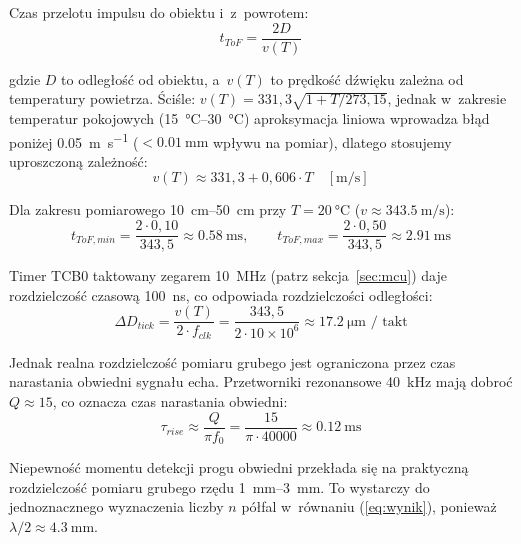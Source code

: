 \documentclass[a4paper,11pt]{article}
\begin{document}
	Czas przelotu impulsu do obiektu i~z~powrotem:
	\begin{equation}
		t_{ToF} = \frac{2D}{v(T)}
		\label{eq:tof}
	\end{equation}
	
	gdzie $D$ to odległość od obiektu, a~$v(T)$ to prędkość dźwięku zależna
	od temperatury powietrza. Ściśle: $v(T) = 331{,}3\sqrt{1 + T/273{,}15}$,
	jednak w~zakresie temperatur pokojowych (\SIrange{15}{30}{\celsius})
	aproksymacja liniowa wprowadza błąd poniżej \SI{0,05}{\metre\per\second}
	($< \SI{0,01}{\milli\metre}$ wpływu na pomiar), dlatego stosujemy
	uproszczoną zależność:
	\begin{equation}
		v(T) \approx 331{,}3 + 0{,}606 \cdot T \quad [\si{\metre\per\second}]
		\label{eq:predkosc_dzwieku}
	\end{equation}
	
	Dla zakresu pomiarowego \SIrange{10}{50}{\centi\metre} przy $T = \SI{20}{\celsius}$
	($v \approx \SI{343,5}{\metre\per\second}$):
	\begin{equation}
		t_{ToF,min} = \frac{2 \cdot 0{,}10}{343{,}5} \approx \SI{0,58}{\milli\second}, \qquad
		t_{ToF,max} = \frac{2 \cdot 0{,}50}{343{,}5} \approx \SI{2,91}{\milli\second}
		\label{eq:tof_zakres}
	\end{equation}
	
	Timer TCB0 taktowany zegarem \SI{10}{\mega\hertz} (patrz sekcja~\ref{sec:mcu})
	daje rozdzielczość czasową \SI{100}{\nano\second}, co odpowiada rozdzielczości odległości:
	\begin{equation}
		\Delta D_{tick} = \frac{v(T)}{2 \cdot f_{clk}} = \frac{343{,}5}{2 \cdot 10 \times 10^6} \approx \SI{17,2}{\micro\metre} \text{ / takt}
		\label{eq:rozdzielczosc_tick}
	\end{equation}
	
	Jednak realna rozdzielczość pomiaru grubego jest ograniczona przez czas narastania
	obwiedni sygnału echa. Przetworniki rezonansowe \SI{40}{\kilo\hertz} mają
	dobroć $Q \approx 15$, co oznacza czas narastania obwiedni:
	\begin{equation}
		\tau_{rise} \approx \frac{Q}{\pi f_0} = \frac{15}{\pi \cdot 40000} \approx \SI{0,12}{\milli\second}
		\label{eq:tau_rise}
	\end{equation}
	
	Niepewność momentu detekcji progu obwiedni przekłada się na praktyczną
	rozdzielczość pomiaru grubego rzędu \SIrange{1}{3}{\milli\metre}. To wystarczy
	do jednoznacznego wyznaczenia liczby $n$ półfal w~równaniu (\ref{eq:wynik}),
	ponieważ $\lambda/2 \approx \SI{4,3}{\milli\metre}$.
	
\end{document}
